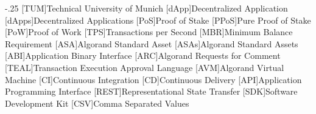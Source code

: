 \documentclass[headsepline,footsepline,footinclude=false,oneside,fontsize=11pt,paper=a4,listof=totoc,bibliography=totoc,parskip=half]{scrbook} %
\begin{document}


\frontmatter{}





\tableofcontents{}

\mainmatter{}








\appendix{}



\begin{acronym}
    \itemsep-.25\baselineskip
    [TUM]{Technical University of Munich}
    [dApp]{Decentralized Application}
    [dApps]{Decentralized Applications}
    [PoS]{Proof of Stake}
    [PPoS]{Pure Proof of Stake}
    [PoW]{Proof of Work}
    [TPS]{Transactions per Second}
    [MBR]{Minimum Balance Requirement}
    [ASA]{Algorand Standard Asset}
    [ASAs]{Algorand Standard Assets}
    [ABI]{Application Binary Interface}
    [ARC]{Algorand Requests for Comment}
    [TEAL]{Transaction Execution Approval Language}
    [AVM]{Algorand Virtual Machine}
    [CI]{Continuous Integration}
    [CD]{Continuous Delivery}
    [API]{Application Programming Interface}
    [REST]{Representational State Transfer}
    [SDK]{Software Development Kit}
    [CSV]{Comma Separated Values}
\end{acronym}

\listoffigures{}
\listoftables{}
\printbibliography{}
\end{document}
